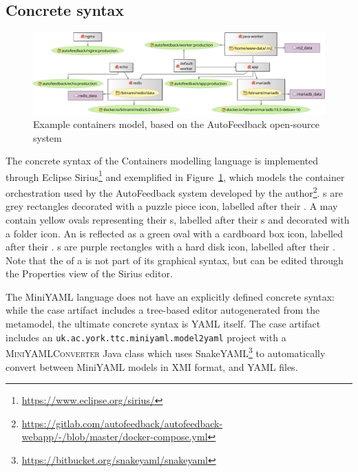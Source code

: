 \documentclass[sigconf,review]{acmart}
\begin{document}
\subsection{Concrete syntax}
\label{sec:concrete-syntax}

\newcommand*{\eclipseproject}[1]{\texttt{#1}}
\newcommand*{\javaclass}[1]{\textsc{#1}}

\begin{figure}
  \centering
  \includegraphics[width=\textwidth]{containers-model}
  \caption{Example containers model, based on the AutoFeedback open-source system}%
  \label{fig:containers-model}
\end{figure}

The concrete syntax of the Containers modelling language is implemented through
Eclipse Sirius\footnote{\url{https://www.eclipse.org/sirius/}} and exemplified
in Figure~\ref{fig:containers-model}, which models the container orchestration
used by the AutoFeedback system developed by the
author\footnote{\url{https://gitlab.com/autofeedback/autofeedback-webapp/-/blob/master/docker-compose.yml}}.
s are grey rectangles decorated with a puzzle piece icon,
labelled after their . A  may contain yellow
ovals representing their s, labelled after their
s and decorated with a folder icon. An  is
reflected as a green oval with a cardboard box icon, labelled after their
. s are purple rectangles with a hard disk
icon, labelled after their . Note that the  of a
 is not part of its graphical syntax, but can be edited
through the Properties view of the Sirius editor.



The MiniYAML language does not have an explicitly defined concrete syntax: while
the case artifact includes a tree-based editor autogenerated from the metamodel,
the ultimate concrete syntax is YAML itself. The case artifact includes an
\eclipseproject{uk.ac.york.ttc.mini\-yaml.model\-2yaml} project with a
\javaclass{MiniYAMLConverter} Java class which uses
SnakeYAML\footnote{\url{https://bitbucket.org/snakeyaml/snakeyaml}} to
automatically convert between Mini\-YAML models in XMI format, and YAML files.
\end{document}
